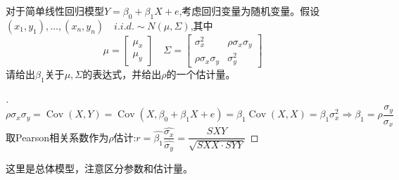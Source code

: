 \documentclass[cn,hazy,green,12pt,normal]{elegantnote}
\DeclareMathOperator{\Cov}{Cov}
\numberwithin{equation}{section}
\numberwithin{subsection}{section}
\begin{document}
\begin{homework}
    对于简单线性回归模型$Y=\beta_0+\beta_1X+e$,考虑回归变量为随机变量。假设$(x_1,y_1),\dots,(x_n,y_n)\quad i.i.d. \sim N(\mu, \Sigma)$,其中
    \[
    \mu=\begin{bmatrix}
        \mu_x\\
        \mu_y
    \end{bmatrix}
    \quad
    \Sigma=\begin{bmatrix}
        \sigma_x^2 & \rho\sigma_x\sigma_y\\
        \rho\sigma_x\sigma_y & \sigma_y^2
    \end{bmatrix}
    \]
    请给出$\beta_1$关于$\mu,\Sigma$的表达式，并给出$\rho $的一个估计量。
\end{homework}
\begin{proof}[\solutionname]
\[
    \rho\sigma_x\sigma_y=\Cov(X,Y)=\Cov(X,\beta_0+\beta_1X+e)=\beta_1\Cov(X,X)=\beta_1\sigma_x^2 \Rightarrow \beta_1=\rho\frac{\sigma_y}{\sigma_x}
    \]
    取Pearson相关系数作为$\rho$估计:$r=\hat{\beta_1}\dfrac{\hat{\sigma_x}}{\hat{\sigma_y}}=\dfrac{SXY}{\sqrt{SXX\cdot SYY}}$
\end{proof}
\begin{note}
    这里是总体模型，注意区分参数和估计量。
\end{note}
\end{document}
